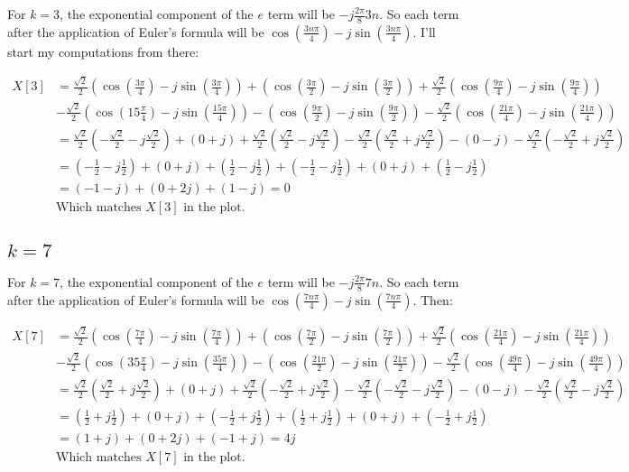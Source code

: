\documentclass{article}
\begin{document}
For $k = 3$, the exponential component of the $e$ term will be $-j\frac{2\pi}{8}3n$. So
each term after the application of Euler's formula will be $\cos(\frac{3n\pi}{4}) - j\sin(\frac{3n\pi}{4})$.
I'll start my computations from there:

\begin{align*}
    X[3] &= \frac{\sqrt{2}}{2} (\cos(\frac{3\pi}{4}) - j\sin(\frac{3\pi}{4}))
    + (\cos(\frac{3\pi}{2}) - j\sin(\frac{3\pi}{2}))
    + \frac{\sqrt{2}}{2} (\cos(\frac{9\pi}{4}) - j\sin(\frac{9\pi}{4})) \\
    &- \frac{\sqrt{2}}{2} (\cos(15\frac{\pi}{4}) - j\sin(\frac{15\pi}{4}))
    - (\cos(\frac{9\pi}{2}) - j\sin(\frac{9\pi}{2}))
    - \frac{\sqrt{2}}{2} (\cos(\frac{21\pi}{4}) - j\sin(\frac{21\pi}{4})) \\
    &= \frac{\sqrt{2}}{2} (-\frac{\sqrt{2}}{2} - j\frac{\sqrt{2}}{2})
    + (0 + j)
    + \frac{\sqrt{2}}{2} (\frac{\sqrt{2}}{2} - j\frac{\sqrt{2}}{2})
    - \frac{\sqrt{2}}{2} (\frac{\sqrt{2}}{2} + j\frac{\sqrt{2}}{2})
    - (0 - j)
    - \frac{\sqrt{2}}{2} (-\frac{\sqrt{2}}{2} + j\frac{\sqrt{2}}{2}) \\
    &= (-\frac{1}{2} - j\frac{1}{2})
    + (0 + j)
    + (\frac{1}{2} - j\frac{1}{2})
    + (-\frac{1}{2} - j\frac{1}{2})
    + (0 + j)
    + (\frac{1}{2} - j\frac{1}{2}) \\
    &= (-1 - j) + (0 + 2j) + (1 - j) = 0 \\
    &\textrm{Which matches } X[3] \textrm{ in the plot.}
\end{align*}

\subsection{$k = 7$}
For $k = 7$, the exponential component of the $e$ term will be $-j\frac{2\pi}{8}7n$. So
each term after the application of Euler's formula will be $\cos(\frac{7n\pi}{4}) - j\sin(\frac{7n\pi}{4})$.
Then:

\begin{align*}
    X[7] &= \frac{\sqrt{2}}{2} (\cos(\frac{7\pi}{4}) - j\sin(\frac{7\pi}{4}))
    + (\cos(\frac{7\pi}{2}) - j\sin(\frac{7\pi}{2}))
    + \frac{\sqrt{2}}{2} (\cos(\frac{21\pi}{4}) - j\sin(\frac{21\pi}{4})) \\
    &- \frac{\sqrt{2}}{2} (\cos(35\frac{\pi}{4}) - j\sin(\frac{35\pi}{4}))
    - (\cos(\frac{21\pi}{2}) - j\sin(\frac{21\pi}{2}))
    - \frac{\sqrt{2}}{2} (\cos(\frac{49\pi}{4}) - j\sin(\frac{49\pi}{4})) \\
    &= \frac{\sqrt{2}}{2} (\frac{\sqrt{2}}{2} + j\frac{\sqrt{2}}{2})
    + (0 + j)
    + \frac{\sqrt{2}}{2} (-\frac{\sqrt{2}}{2} + j\frac{\sqrt{2}}{2})
    - \frac{\sqrt{2}}{2} (-\frac{\sqrt{2}}{2} - j\frac{\sqrt{2}}{2})
    - (0 - j)
    - \frac{\sqrt{2}}{2} (\frac{\sqrt{2}}{2} - j\frac{\sqrt{2}}{2}) \\
    &= (\frac{1}{2} + j\frac{1}{2})
    + (0 + j)
    + (-\frac{1}{2} + j\frac{1}{2})
    + (\frac{1}{2} + j\frac{1}{2})
    + (0 + j)
    + (-\frac{1}{2} + j\frac{1}{2}) \\
    &= (1 + j) + (0 + 2j) + (-1 + j) = 4j \\
    &\textrm{Which matches } X[7] \textrm{ in the plot.}
\end{align*}
\end{document}
